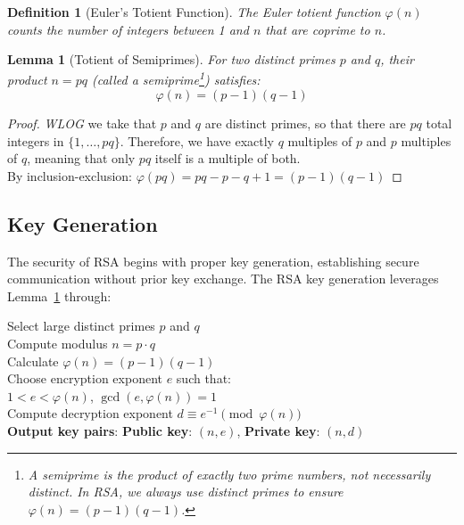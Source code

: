 \documentclass[11pt,a4paper]{article}
\newtheorem{lemma}[theorem]{Lemma}
\newtheorem{definition}[theorem]{Definition}
\numberwithin{equation}{section}
\newenvironment{algorithmBox}[1][]
{
    \begin{tcolorbox}[
        colback=gray!10,              %
        colframe=gray!50!black,       %
        sharp corners,                %
        boxrule=0.5pt,                %
        left=5pt, right=5pt,          %
        top=5pt, bottom=5pt,          %
        title={\centering\bfseries RSA Cryptosystem}, %
        fonttitle=\small\sffamily,    %
        #1                            %
    ]
    \begin{minipage}{\linewidth}     %
}
{
    \end{minipage}
    \end{tcolorbox}
}
\begin{document}
\begin{definition}[Euler's Totient Function]
The Euler totient function $\varphi(n)$ counts the number of integers between 1 and $n$ that are coprime to $n$.
\end{definition}
\begin{lemma}[Totient of Semiprimes]\label{lem:totient-semiprime}
For two distinct primes \( p \) and \( q \), their product \( n = pq \) (called a \emph{semiprime}\footnote{A semiprime is the product of exactly two prime numbers, not necessarily distinct. In RSA, we always use \emph{distinct} primes to ensure $\varphi(n) = (p-1)(q-1)$.}) satisfies:
\[\varphi(n) = (p-1)(q-1)\]
\end{lemma}

\begin{proof}
\textit{WLOG} we take that $p$  and  $q$ are distinct primes, so that there are  $pq$ total integers in $\{1,\ldots,pq\}$. Therefore, we have exactly $q$ multiples of $p$ and $p$ multiples of $q$, meaning that only $pq$ itself is a multiple of both. \\
    By inclusion-exclusion: $\varphi(pq) = pq - p - q + 1 = (p-1)(q-1)$
\end{proof}

\subsection{Key Generation}
The security of RSA begins with proper key generation, establishing secure communication without prior key exchange. The RSA key generation leverages Lemma~\ref{lem:totient-semiprime} through:
\begin{algorithmBox}
    \begin{center}
        Select large distinct primes $p$ and $q$ \\
        Compute modulus $n = p \cdot q$ \\
        Calculate $\varphi(n) = (p-1)(q-1)$ \\
        Choose encryption exponent $e$ such that: \\
         $1 < e < \varphi(n)$, \hspace{0.2cm} $\gcd(e, \varphi(n)) = 1$ \\
        Compute decryption exponent $d \equiv e^{-1} \pmod{\varphi(n)}$ \\
        \textbf{Output key pairs}:
        \textbf{Public key}: $(n, e)$,
        \textbf{Private key}: $(n, d)$
    \end{center}
\end{algorithmBox}
\end{document}
